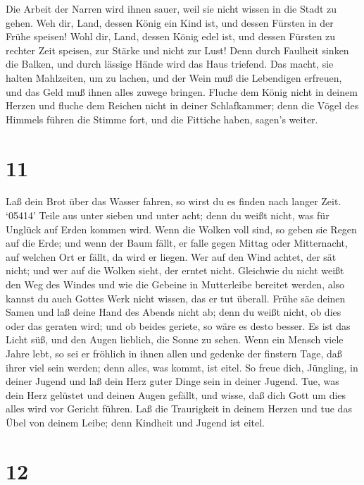  Die Arbeit der Narren wird ihnen sauer, weil sie nicht
wissen in die Stadt zu gehen.  Weh dir, Land, dessen König
ein Kind ist, und dessen Fürsten in der Frühe speisen! 
Wohl dir, Land, dessen König edel ist, und dessen Fürsten zu rechter
Zeit speisen, zur Stärke und nicht zur Lust!  Denn durch
Faulheit sinken die Balken, und durch lässige Hände wird das Haus
triefend.  Das macht, sie halten Mahlzeiten, um zu lachen,
und der Wein muß die Lebendigen erfreuen, und das Geld muß ihnen alles
zuwege bringen.  Fluche dem König nicht in deinem Herzen
und fluche dem Reichen nicht in deiner Schlafkammer; denn die Vögel des
Himmels führen die Stimme fort, und die Fittiche haben, sagen's weiter.

\hypertarget{section-10}{%
\section{11}\label{section-10}}

 Laß dein Brot über das Wasser fahren, so wirst du es finden
nach langer Zeit.  `05414' Teile aus unter sieben und unter
acht; denn du weißt nicht, was für Unglück auf Erden kommen wird.
 Wenn die Wolken voll sind, so geben sie Regen auf die Erde;
und wenn der Baum fällt, er falle gegen Mittag oder Mitternacht, auf
welchen Ort er fällt, da wird er liegen.  Wer auf den Wind
achtet, der sät nicht; und wer auf die Wolken sieht, der erntet nicht.
 Gleichwie du nicht weißt den Weg des Windes und wie die
Gebeine in Mutterleibe bereitet werden, also kannst du auch Gottes Werk
nicht wissen, das er tut überall.  Frühe säe deinen Samen
und laß deine Hand des Abends nicht ab; denn du weißt nicht, ob dies
oder das geraten wird; und ob beides geriete, so wäre es desto besser.
 Es ist das Licht süß, und den Augen lieblich, die Sonne zu
sehen.  Wenn ein Mensch viele Jahre lebt, so sei er fröhlich
in ihnen allen und gedenke der finstern Tage, daß ihrer viel sein
werden; denn alles, was kommt, ist eitel.  So freue dich,
Jüngling, in deiner Jugend und laß dein Herz guter Dinge sein in deiner
Jugend. Tue, was dein Herz gelüstet und deinen Augen gefällt, und wisse,
daß dich Gott um dies alles wird vor Gericht führen.  Laß
die Traurigkeit in deinem Herzen und tue das Übel von deinem Leibe; denn
Kindheit und Jugend ist eitel.

\hypertarget{section-11}{%
\section{12}\label{section-11}}

